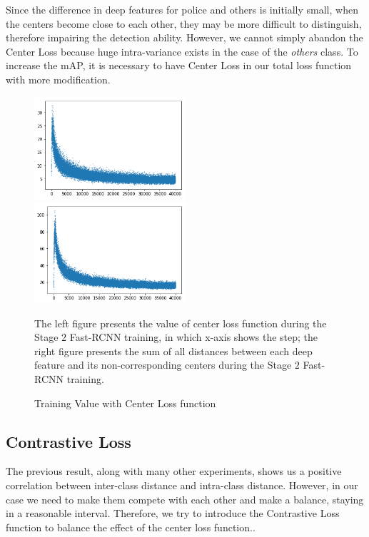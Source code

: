 \documentclass[a4paper]{article}
\begin{document}
Since the difference in deep features for police and others is initially small, when the centers become close to each other, they may be more difficult to distinguish, therefore impairing the detection ability. However, we cannot simply abandon the Center Loss because huge intra-variance exists in the case of the \textit{others} class. To increase the mAP, it is necessary to have Center Loss in our total loss function with more modification.
\begin{figure}[H]
\centering
\begin{minipage}{\textwidth} %
\includegraphics[width=0.5\textwidth]{center_2.png}
\includegraphics[width=0.5\textwidth]{sum_of_dot_2.png}\\
\footnotesize{The left figure presents the value of center loss function during the Stage $2$ Fast-RCNN training, in which x-axis shows the step; the right figure presents the sum of all distances between each deep feature and its non-corresponding centers during the Stage $2$ Fast-RCNN training. \par}
\end{minipage}
\caption{Training Value with Center Loss function}
\label{fig:center_loss_failure}
\end{figure}

\subsection{Contrastive Loss}
The previous result, along with many other experiments, shows us a positive correlation between inter-class distance and intra-class distance. However, in our case we need to make them compete with each other and make a balance, staying in a reasonable interval. Therefore, we try to introduce the Contrastive Loss function to balance the effect of the center loss function.. 
\end{document}
